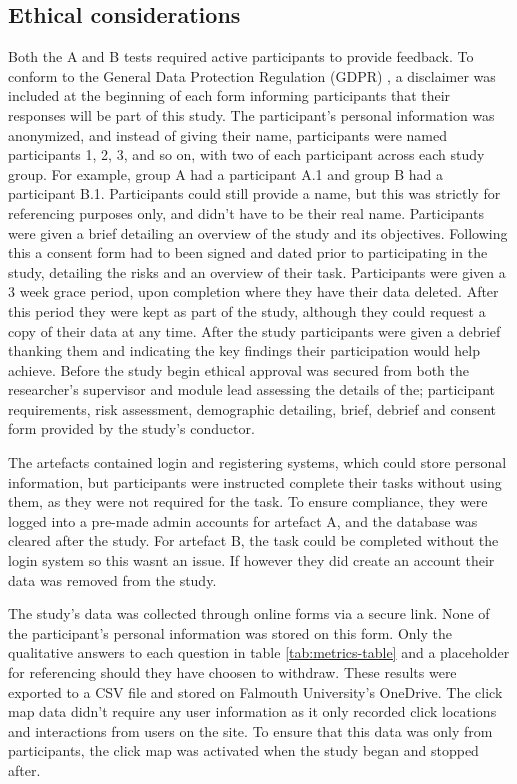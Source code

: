 \documentclass[article]{IEEEtran}
\begin{document}
        \subsection{Ethical considerations}
            Both the A and B tests required active participants to provide feedback. To conform to the General Data Protection Regulation (GDPR) \cite{gdpr}, a disclaimer was included at the beginning of each form informing participants that their responses will be part of this study. The participant's personal information was anonymized, and instead of giving their name, participants were named participants 1, 2, 3, and so on, with two of each participant across each study group. For example, group A had a participant A.1 and group B had a participant B.1. Participants could still provide a name, but this was strictly for referencing purposes only, and didn't have to be their real name. Participants were given a brief detailing an overview of the study and its objectives. Following this a consent form had to been signed and dated prior to participating in the study, detailing the risks and an overview of their task. Participants were given a 3 week grace period, upon completion where they have their data deleted. After this period they were kept as part of the study, although they could request a copy of their data at any time. After the study participants were given a debrief thanking them and indicating the key findings their participation would help achieve. Before the study begin ethical approval was secured from both the researcher's supervisor and module lead assessing the details of the; participant requirements, risk assessment, demographic detailing, brief, debrief and consent form provided by the study's conductor.
            
            The artefacts contained login and registering systems, which could store personal information, but participants were instructed complete their tasks without using them, as they were not required for the task. To ensure compliance, they were logged into a pre-made admin accounts for artefact A, and the database was cleared after the study. For artefact B, the task could be completed without the login system so this wasnt an issue. If however they did create an account their data was removed from the study.

            The study's data was collected through online forms via a secure link. None of the participant's personal information was stored on this form. Only the qualitative answers to each question in table \ref{tab:metrics-table} and a placeholder for referencing should they have choosen to withdraw. These results were exported to a CSV file and stored on Falmouth University's OneDrive. The click map data didn't require any user information as it only recorded click locations and interactions from users on the site. To ensure that this data was only from participants, the click map was activated when the study began and stopped after.
\end{document}
